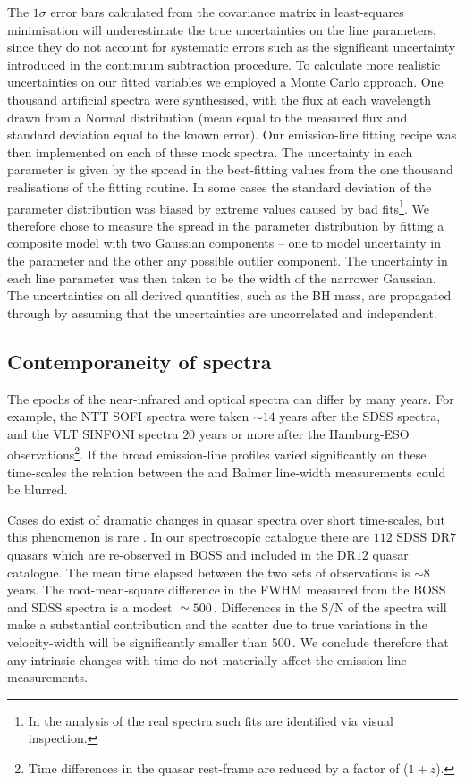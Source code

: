 The $1$$\sigma$ error bars calculated from the covariance matrix in least-squares minimisation will underestimate the true uncertainties on the line parameters, since they do not account for systematic errors such as the significant uncertainty introduced in the continuum subtraction procedure.  
To calculate more realistic uncertainties on our fitted variables we employed a Monte Carlo approach. 
One thousand artificial spectra were synthesised, with the flux at each wavelength drawn from a Normal distribution (mean equal to the measured flux and standard deviation equal to the known error).
Our emission-line fitting recipe was then implemented on each of these mock spectra. 
The uncertainty in each parameter is given by the spread in the best-fitting values from the one thousand realisations of the fitting routine. 
In some cases the standard deviation of the parameter distribution was biased by extreme values caused by bad fits\footnote{In the analysis of the real spectra such fits are identified via visual inspection.}. 
We therefore chose to measure the spread in the parameter distribution by fitting a composite model with two Gaussian components -- one to model uncertainty in the parameter and the other any possible outlier component. 
The uncertainty in each line parameter was then taken to be the width of the narrower Gaussian. 
The uncertainties on all derived quantities, such as the BH mass, are propagated through by assuming that the uncertainties are uncorrelated and independent. 

\subsection{Contemporaneity of spectra}

The epochs of the near-infrared and optical spectra can differ by many years.
For example, the NTT SOFI spectra were taken $\sim14$ years after the SDSS spectra, and the VLT SINFONI spectra $20$ years or more after the Hamburg-ESO observations\footnote{Time differences in the quasar rest-frame are reduced by a factor of ($1 + z$).}.
If the broad emission-line profiles varied significantly on these time-scales the relation between the  and Balmer line-width measurements could be blurred. 

Cases do exist of dramatic changes in quasar spectra over short time-scales, but this phenomenon is rare \citep{macleod16}. 
In our spectroscopic catalogue there are $112$ SDSS DR$7$ quasars which are re-observed in BOSS and included in the DR$12$ quasar catalogue. 
The mean time elapsed between the two sets of observations is $\sim8$ years. 
The root-mean-square difference in the  FWHM measured from the BOSS and SDSS spectra is a modest $\simeq500$\,\kms. 
Differences in the S/N of the spectra will make a substantial contribution and the scatter due to true variations in the  velocity-width will be significantly smaller than $500$\,\kms. 
We conclude therefore that any intrinsic changes with time do not materially affect the emission-line measurements.

